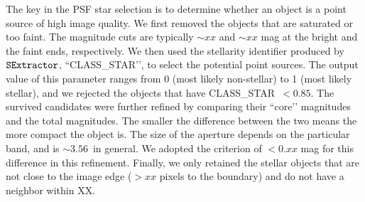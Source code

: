 \documentclass[apj,iop]{emulateapj}
\begin{document}
   The key in the PSF star selection is to determine whether an object is a point source of high image quality. We first removed the objects that are saturated or too faint. The magnitude cuts are typically $\sim xx$ and $\sim xx$ mag at the bright and the faint ends, respectively. We then used the stellarity identifier produced by $\tt SExtractor$, ``CLASS\_STAR’’, to select the potential point sources. The output value of this parameter ranges from 0 (most likely non-stellar) to 1 (most likely stellar), and we rejected the objects that have CLASS\_STAR~$< 0.85$. The survived candidates were further refined by comparing their ``core’’ magnitudes and the total magnitudes. The smaller the difference between the two means the more compact the object is. The size of the aperture depends on the particular band, and is $\sim 3.56$\arcsec\, in general. We adopted the criterion of $<0.xx$ mag for this difference in this refinement. Finally, we only retained the stellar objects that are not close to the image edge ($>xx$ pixels to the boundary) and do not have a neighbor within XX\arcsec.

\end{document}
